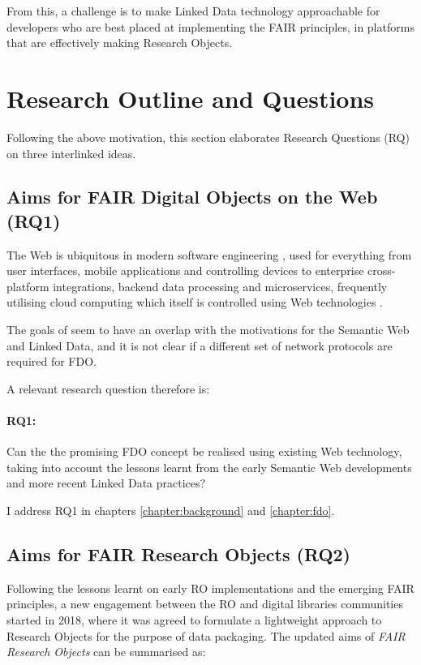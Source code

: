 From this, a challenge is to make Linked Data technology approachable for developers who are best placed at implementing the FAIR principles, in platforms that are effectively making Research Objects.



\section{Research Outline and Questions}
\label{intro:outline}

Following the above motivation, this section elaborates Research Questions (RQ) on three interlinked ideas.


\subsection{Aims for FAIR Digital Objects on the Web (RQ1)}
\label{intro:rq1}

The Web is ubiquitous in modern software engineering \cite{Taivalsaari 2021}, used for everything from user interfaces, mobile applications and controlling devices to enterprise cross-platform integrations, backend data processing and microservices, frequently utilising cloud computing which itself is controlled using Web technologies \cite{Marinescu 2023}.

The goals of  seem to have an overlap with the motivations for the Semantic Web and Linked Data, and it is not clear if a different set of network protocols are required for FDO.

A relevant research question therefore is: 

\paragraph{RQ1:}\label{rq1} 
Can the the promising FDO concept be realised using existing Web technology, taking into account the lessons learnt from the early Semantic Web developments and more recent Linked Data practices?

I address RQ1 in chapters \ref{chapter:background} and \ref{chapter:fdo}.


\subsection{Aims for FAIR Research Objects (RQ2)}
\label{intro:rq2}

Following the lessons learnt on early \acrfull{RO} implementations and the emerging \acrshort{FAIR} principles, a new engagement between the RO and digital libraries communities started in 2018, where it was agreed to formulate a lightweight approach to Research Objects \cite{Sefton 2018,Ó Carragáin 2019b} for the purpose of data packaging. The updated aims of \emph{FAIR Research Objects} can be summarised as:
 
